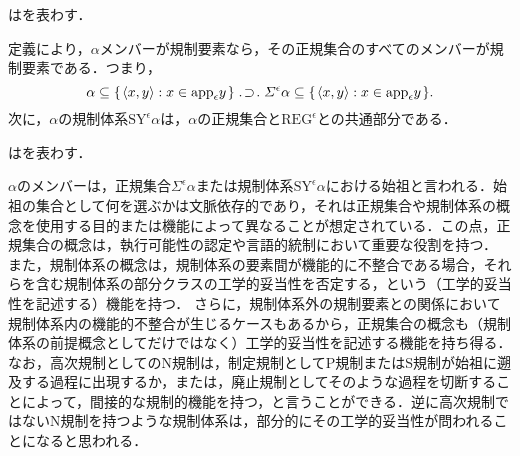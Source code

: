 \begin{df}
\label{df:正規集合}
\kagi{$
    \varSigma^{\epsilon}\alpha
$}はを表わす．
\end{df}

\noindent 定義により，$ \alpha $メンバーが規制要素なら，その正規集合のすべてのメンバーが規制要素である．つまり，
\[
    \alpha\subseteq\classab{\orp{x,y}:x\in\app{\epsilon} y}\case{1}{1}{1}\varSigma^{\epsilon}\alpha\subseteq\classab{\orp{x,y}:x\in\app{\epsilon} y}.
\]
次に，$\alpha$の規制体系$ \mathrm{SY}^{\epsilon}\alpha $は，$\alpha$の正規集合と$ \mathrm{REG}^\epsilon $との共通部分である．

\begin{df}
\label{df:規制体系}
はを表わす．
\end{df}

\noindent $ \alpha $のメンバーは，正規集合$ \varSigma^{\epsilon}\alpha $または規制体系$ \mathrm{SY}^{\epsilon}\alpha $における始祖と言われる．始祖の集合として何を選ぶかは文脈依存的であり，それは正規集合や規制体系の概念を使用する目的または機能によって異なることが想定されている．この点，正規集合の概念は，執行可能性の認定や言語的統制において重要な役割を持つ．
また，規制体系の概念は，規制体系の要素間が機能的に不整合である場合，それらを含む規制体系の部分クラスの工学的妥当性を否定する，という（工学的妥当性を記述する）機能を持つ．
さらに，規制体系外の規制要素との関係において規制体系内の機能的不整合が生じるケースもあるから，正規集合の概念も（規制体系の前提概念としてだけではなく）工学的妥当性を記述する機能を持ち得る．
なお，高次規制としてのN規制は，制定規制としてP規制またはS規制が始祖に遡及する過程に出現するか，または，廃止規制としてそのような過程を切断することによって，間接的な規制的機能を持つ，と言うことができる．逆に高次規制ではないN規制を持つような規制体系は，部分的にその工学的妥当性が問われることになると思われる．

